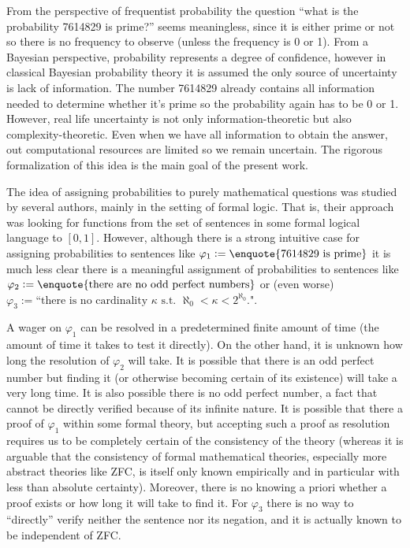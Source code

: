 \documentclass{article}
\numberwithin{equation}{section}
\theoremstyle{definition}
\theoremstyle{plain}
\begin{document}
From the perspective of frequentist probability the question \enquote{what is the probability 7614829 is prime?} seems meaningless, since it is either prime or not so there is no frequency to observe (unless the frequency is 0 or 1). From a Bayesian perspective, probability represents a degree of confidence, however in classical Bayesian probability theory it is assumed the only source of uncertainty is lack of information. The number 7614829 already contains all information needed to determine whether it's prime so the probability again has to be 0 or 1. However, real life uncertainty is not only information-theoretic but also complexity-theoretic. Even when we have all information to obtain the answer, out computational resources are limited so we remain uncertain. The rigorous formalization of this idea is the main goal of the present work.

The idea of assigning probabilities to purely mathematical questions was studied by several authors\cite{Gaifman_2004,Hutter_2013,Demski_2012,Christiano_2014,Garrabrant_2015}, mainly in the setting of formal logic. That is, their approach was looking for functions from the set of sentences in some formal logical language to $[0,1]$. However, although there is a strong intuitive case for assigning probabilities to sentences like $\varphi_1:=\text{\enquote{7614829 is prime}}$ it is much less clear there is a meaningful assignment of probabilities to sentences like $\varphi_2 := \text{\enquote{there are no odd perfect numbers}}$ or (even worse) $\varphi_3 := \text{``there is no cardinality } \kappa \text{ s.t. } \aleph_0 < \kappa < 2^{\aleph_0} \text{."}$.

A wager on $\varphi_1$ can be resolved in a predetermined finite amount of time (the amount of time it takes to test it directly). On the other hand, it is unknown how long the resolution of $\varphi_2$ will take. It is possible that there is an odd perfect number but finding it (or otherwise becoming certain of its existence) will take a very long time. It is also possible there is no odd perfect number, a fact that cannot be directly verified because of its infinite nature. It is possible that there a proof of $\varphi_1$ within some formal theory, but accepting such a proof as resolution requires us to be completely certain of the consistency of the theory (whereas it is arguable that the consistency of formal mathematical theories, especially more abstract theories like ZFC, is itself only known empirically and in particular with less than absolute certainty). Moreover, there is no knowing a priori whether a proof exists or how long it will take to find it. For $\varphi_3$ there is no way to \enquote{directly} verify neither the sentence nor its negation, and it is actually known to be independent of ZFC.
\end{document}
